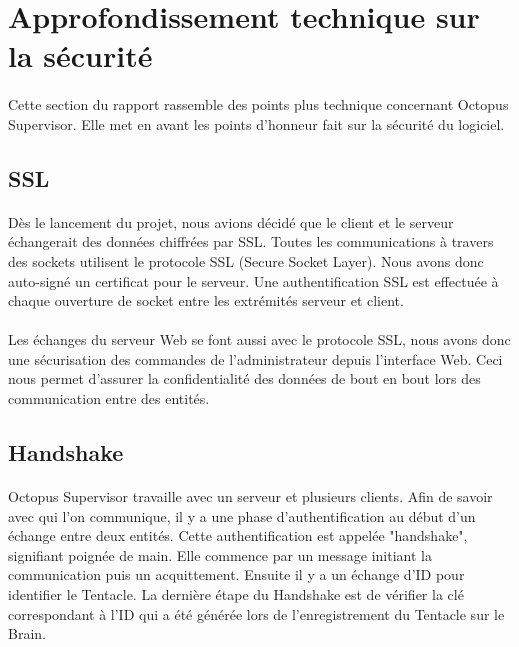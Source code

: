 \section{Approfondissement technique sur la sécurité}
\paragraph{}
Cette section du rapport rassemble des points plus technique concernant Octopus Supervisor. Elle met en avant les points d'honneur fait sur la sécurité du logiciel.

\subsection{SSL}
\paragraph{}
Dès le lancement du projet, nous avions décidé que le client et le serveur échangerait des données chiffrées par SSL. 
Toutes les communications à travers des sockets utilisent le protocole SSL (Secure Socket Layer). Nous avons donc auto-signé un certificat pour le serveur.
Une authentification SSL est effectuée à chaque ouverture de socket entre les extrémités serveur et client.
\paragraph{}
Les échanges du serveur Web se font aussi avec le protocole SSL, nous avons donc une sécurisation des commandes de l'administrateur depuis l'interface Web.
Ceci nous permet d'assurer la confidentialité des données de bout en bout lors des communication entre des entités.

\subsection{Handshake}
\paragraph{}
Octopus Supervisor travaille avec un serveur et plusieurs clients. Afin de savoir avec qui l'on communique, il y a une phase d'authentification au début d'un échange entre deux entités.
Cette authentification est appelée "handshake", signifiant poignée de main. Elle commence par un message initiant la communication puis un acquittement. Ensuite il y a un échange d'ID pour identifier le Tentacle.
La dernière étape du Handshake est de vérifier la clé correspondant à l'ID qui a été générée lors de l'enregistrement du Tentacle sur le Brain.

